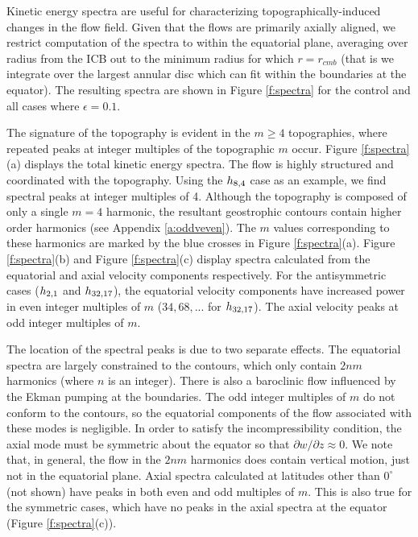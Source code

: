 Kinetic energy spectra are useful for characterizing topographically-induced changes in the flow field. 
Given that the flows are primarily axially aligned, we restrict computation of the spectra to within the equatorial plane, averaging over radius from the ICB out to the minimum radius for which $r = r_{cmb}$ (that is we integrate over the largest annular disc which can fit within the boundaries at the equator).  
The resulting spectra are shown in Figure \ref{f:spectra} for the control and all cases where $\epsilon  = 0.1$.

The signature of the topography is evident in the $m\geq 4$ topographies, where repeated peaks at integer multiples of the topographic $m$ occur. 
Figure \ref{f:spectra}(a) displays the total kinetic energy spectra. The flow is highly structured and coordinated with the topography. 
Using the $h_{8,4}$ case as an example, we find spectral peaks at integer multiples of 4. Although the topography is composed of only a single $m=4$ harmonic, the resultant geostrophic contours contain higher order harmonics (see Appendix \ref{a:oddveven}). 
The $m$ values corresponding to these harmonics are marked by the blue crosses in Figure \ref{f:spectra}(a). 
Figure \ref{f:spectra}(b) and Figure \ref{f:spectra}(c) display spectra calculated from the equatorial and axial velocity components respectively.
For the antisymmetric cases ($h_{2,1}$ and $h_{32,17}$),
the equatorial velocity components have increased power in even integer multiples of $m$ ($34,68, ...$ for  $h_{32,17}$). 
The axial velocity peaks at odd integer multiples of $m.$

The location of the spectral peaks is due to two separate effects. The equatorial spectra are largely constrained to the contours, which only contain $2nm$ harmonics (where $n$ is an integer). 
There is also a baroclinic flow influenced by the Ekman pumping at the boundaries. 
The odd integer multiples of $m$ do not conform to the contours, so the equatorial components of the flow associated with these modes is negligible. In order to satisfy the incompressibility condition, the axial mode must be symmetric about the equator so that $\partial w/\partial z\approx 0$.
We note that, in general, the flow in the $2nm$ harmonics does contain vertical motion, just not in the equatorial plane. Axial spectra calculated at latitudes other than $0^{\circ}$ (not shown) have peaks in both even and odd multiples of $m.$
This is also true for the symmetric cases, which have no peaks in the axial spectra at the equator (Figure \ref{f:spectra}(c)).

